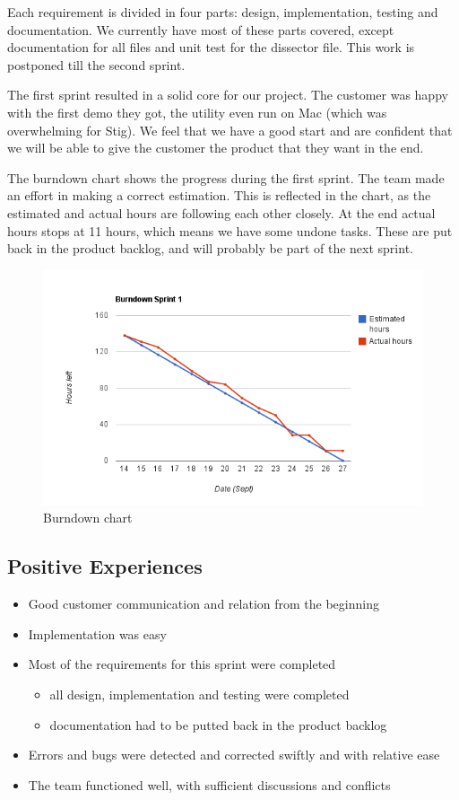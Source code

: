 Each requirement is divided in four parts: design, implementation, testing and documentation. We currently have most of these parts covered, except documentation for all files and unit test for the dissector file. This work is postponed till the second sprint.

The first sprint resulted in a solid core for our project. The customer was happy with the first demo they got, the utility even run on Mac (which was overwhelming for Stig). We feel that we have a good start and are confident that we will be able to give the customer the product that they want in the end.

The burndown chart shows the progress during the first sprint. The team made an effort in making a correct estimation. This is reflected in the chart, as the estimated and actual hours are  following each other closely. At the end actual hours stops at 11 hours, which means we have some undone tasks. These are put back in the product backlog, and will probably be part of the next sprint. 

\begin{figure}[here]
\includegraphics[width=1.2\textwidth]{./sprints/img/burndown_chart_s1.png}
\caption{Burndown chart}
\label{fig:sp1_burndown}
\end{figure}

\subsection{Positive Experiences}
\begin{itemize}
	\item Good customer communication and relation from the beginning
	\item Implementation was easy
	\item Most of the requirements for this sprint were completed
	\begin{itemize} 
		\item all design, implementation and testing were completed
		\item documentation had to be putted back in the product backlog 
	\end{itemize}
	\item Errors and bugs were detected and corrected swiftly and with relative ease
	\item The team functioned well, with sufficient discussions and conflicts
\end{itemize}
